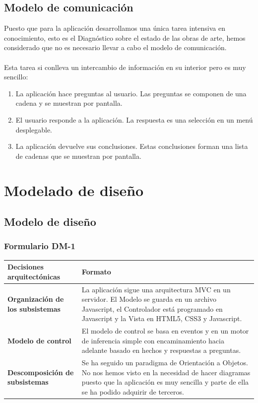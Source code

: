 \documentclass[a4paper,11pt]{article}
\begin{document}
		\subsection{Modelo de comunicación}
			Puesto que para la aplicación desarrollamos una única tarea intensiva en
			conocimiento, esto es el Diagnóstico sobre el estado de las obras de arte,
			hemos considerado que no es necesario llevar a cabo el modelo de
			comunicación.\\\\
			Esta tarea si conlleva un intercambio de información en su interior pero es
			muy sencillo:
			\begin{enumerate}
				\item La aplicación hace preguntas al usuario. Las preguntas se componen de
				una cadena y se muestran por pantalla.
				\item El usuario responde a la aplicación. La respuesta es una selección en
				un menú desplegable.
				\item La aplicación devuelve sus conclusiones. Estas conclusiones forman una
				lista de cadenas que se muestran por pantalla.
			\end{enumerate}
	\newpage
	\section{Modelado de diseño}
		\subsection{Modelo de diseño}
			\subsubsection{Formulario DM-1}
			\begin{center}
				\begin{tabular}{| l | p{5cm} |}
					\hline
					\cellcolor[RGB]{224,233,250}\textbf{Decisiones arquitectónicas} &
					\cellcolor[RGB]{224,233,250}\textbf{Formato} \\
					\hline
					\cellcolor[RGB]{224,233,250}\textbf{Organización de los subsistemas} & La
					aplicación sigue una arquitectura MVC en un servidor. El Modelo se guarda en un archivo Javascript, el Controlador está programado en Javascript y la Vista en HTML5, CSS3 y Javascript.
					\\
					\hline
					\cellcolor[RGB]{224,233,250}\textbf{Modelo de control} & El modelo de
					control se basa en eventos y en un motor de inferencia simple con encaminamiento hacia adelante basado en hechos y respuestas a preguntas.\\
					\hline
					\cellcolor[RGB]{224,233,250}\textbf{Descomposición de subsistemas} & Se ha
					seguido un paradigma de Orientación a Objetos. No nos hemos visto en la necesidad de hacer diagramas puesto que la aplicación es muy sencilla y parte de ella se ha podido adquirir de terceros.\\
					\hline
				\end{tabular}
			\end{center}
			\newpage
\end{document}
